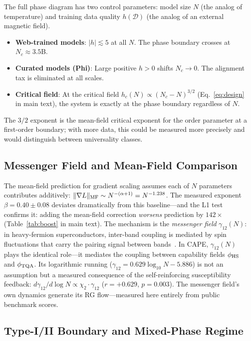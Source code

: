 \documentclass[11pt]{article}
\begin{document}
The full phase diagram has two control parameters: model size $N$ (the analog of temperature) and training data quality $h(\mathcal{D})$ (the analog of an external magnetic field).
\begin{itemize}
  \item \textbf{Web-trained models}: $|h| \lesssim 5$ at all $N$. The phase boundary crosses at $N_c \approx 3.5$B.
  \item \textbf{Curated models (Phi)}: Large positive $h > 0$ shifts $N_c \to 0$. The alignment tax is eliminated at all scales.
  \item \textbf{Critical field}: At the critical field $h_c(N) \propto (N_c-N)^{3/2}$ (Eq.~\ref{eq:design} in main text), the system is exactly at the phase boundary regardless of $N$.
\end{itemize}
The $3/2$ exponent is the mean-field critical exponent for the order parameter at a first-order boundary; with more data, this could be measured more precisely and would distinguish between universality classes.

\subsection{Messenger Field and Mean-Field Comparison}

The mean-field prediction for gradient scaling assumes each of $N$ parameters contributes additively: $\|\nabla L\|_{\rm MF} \sim N^{-(\alpha+1)} = N^{-1.238}$.
The measured exponent $\beta=0.40\pm0.08$ deviates dramatically from this baseline---and the L1 test confirms it: adding the mean-field correction \emph{worsens} prediction by $142\times$ (Table~\ref{tab:boost} in main text).
The mechanism is the \emph{messenger field} $\gamma_{12}(N)$: in heavy-fermion superconductors, inter-band coupling is mediated by spin fluctuations that carry the pairing signal between bands~\cite{amin2020}.
In CAPE, $\gamma_{12}(N)$ plays the identical role---it mediates the coupling between capability fields $\phi_{\rm HS}$ and $\phi_{\rm TQA}$.
Its logarithmic running ($\gamma_{12} = 0.629\log_{10}N - 5.886$) is not an assumption but a measured consequence of the self-reinforcing susceptibility feedback: $d\gamma_{12}/d\log N \propto \chi_2 \cdot \gamma_{12}$ ($r=+0.629$, $p=0.003$).
The messenger field's own dynamics generate its RG flow---measured here entirely from public benchmark scores.

\subsection{Type-I/II Boundary and Mixed-Phase Regime}
\end{document}
